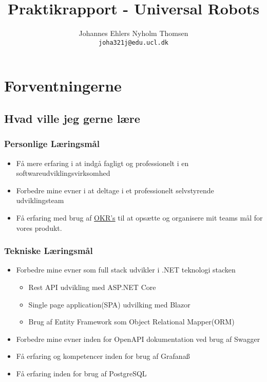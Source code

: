 \documentclass[a4paper]{article}
\title{Praktikrapport - Universal Robots}
\author
{
    Johannes Ehlers Nyholm Thomsen\\ 
    \texttt{joha321j@edu.ucl.dk}
}
\begin{document}
\maketitle

\newpage

\tableofcontents

\newpage

\section{Forventningerne}
\subsection{Hvad ville jeg gerne lære}

\subsubsection*{Personlige Læringsmål}
\begin{itemize}
    \item Få mere erfaring i at indgå fagligt og professionelt i en 
    softwareudviklingsvirksomhed
    \item Forbedre mine evner i at deltage i et professionelt selvstyrende 
    udviklingsteam
    \item Få erfaring med brug af \href{https://en.wikipedia.org/wiki/OKR}{OKR's}
     til at opsætte og organisere mit teams mål for vores produkt.
\end{itemize}

\subsubsection*{Tekniske Læringsmål}
\begin{itemize}
    \item Forbedre mine evner som full stack udvikler i .NET teknologi stacken
    \begin{itemize}
        \item Rest API udvikling med ASP.NET Core
        \item Single page application(SPA) udvilking med Blazor
        \item Brug af Entity Framework som Object Relational Mapper(ORM)
    \end{itemize}
    \item Forbedre mine evner inden for OpenAPI dokumentation ved brug af
    Swagger
    \item Få erfaring og kompetencer inden for brug af Grafanaß
    \item Få erfaring inden for brug af PostgreSQL
\end{itemize}
\end{document}
